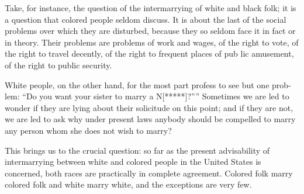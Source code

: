 \documentclass[letterpaper,10pt,english]{jupyterBook}
\begin{document}
\sphinxAtStartPar
Take, for instance, the question of the intermarrying of white and black folk; it is a question that colored people sel­dom discuss. It is about the last of the social problems over which they are dis­turbed, because they so seldom face it in fact or in theory. Their problems are problems of work and wages, of the right to vote, of the right to travel decently, of the right to frequent places of pub­ lic amusement, of the right to public security.

\sphinxAtStartPar
White people, on the other hand, for the most part profess to see but one prob­lem: “Do you want your sister to marry a N{[}*****{]}?”” Sometimes we are led to wonder if they are lying about their solicitude on this point; and if they are not, we are led to ask why under present laws anybody should be compelled to marry any person whom she does not wish to marry?

\sphinxAtStartPar
This brings us to the crucial question: so far as the present advisability of intermarrying between white and colored people in the United States is concerned, both races are practically in complete agreement. Colored folk marry colored folk and white marry white, and the exceptions are very few.
\end{document}
